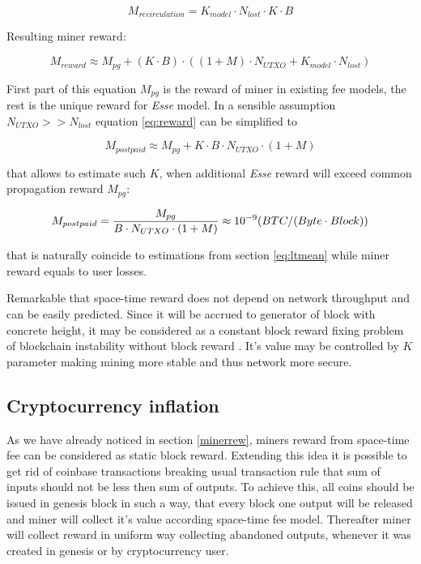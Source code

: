 \documentclass[]{article}   %
\newcommand{\authnote}[2]{\marginpar{\parbox{\marginparwidth}{\tiny %
  \textsf{#1 {\textcolor{blue}{notes: #2}}}}}%
  \textcolor{blue}{\textbf{\dag}}}
\newcommand{\authnote}[2]{
  \textsf{#1 \textcolor{blue}{: #2}}}
\newcommand{\authnote}[2]{}
\newcommand{\dnote}[1]{{\authnote{\textcolor{blue}{Dima notes}}{#1}}}
\newcommand{\esse}{\textit{Esse}}
\begin{document}
\begin{equation}
M_{recirculation} = {K_{model} \cdot  N_{lost} \cdot K \cdot B}
\end{equation}

Resulting miner reward:

\begin{equation}
\label{eq:reward}
M_{reward} \approx M_{pg} + (K \cdot B) \cdot ((1 + M) \cdot N_{UTXO} + K_{model} \cdot N_{lost})
\end{equation}

First part of this equation $M_{pg}$ is the reward of miner in existing fee models, the rest is the unique reward for \esse{} model.  In a sensible assumption $N_{UTXO} >> N_{lost}$ equation \ref{eq:reward} can be simplified to

\begin{equation}
M_{postpaid} \approx M_{pg} + K \cdot B \cdot N_{UTXO} \cdot (1 + M)
\end{equation}

that allows to estimate such $K$, when additional \esse{} reward will exceed common propagation reward $M_{pg}$:

\begin{equation}
M_{postpaid} = {M_{pg} \over B \cdot N_{UTXO} \cdot (1 + M)} \approx 10^{-9} ({BTC / (Byte \cdot Block)})
\end{equation}

that is naturally coincide to estimations from section \ref{eq:ltmean} while miner reward equals to user losses.

Remarkable that space-time reward does not depend on network throughput and can be easily predicted. Since it will be accrued to generator of block with concrete height, it may be considered as a constant block reward fixing problem of blockchain instability without block reward \cite{carlsten2016instability}. It's value may be controlled by $K$ parameter making mining more stable and thus network more secure.

\dnote{What is an output value when miner is interested in collecting it?}

\subsection{Cryptocurrency inflation}

As we have already noticed in section \ref{minerrew}, miners reward from space-time fee can be considered as static block reward. Extending this idea it is possible to get rid of coinbase transactions breaking usual transaction rule that sum of inputs should not be less then sum of outputs. To achieve this, all coins should be issued in genesis block in such a way, that every block one output will be released and miner will collect it's value according space-time fee model. Thereafter miner will collect reward in uniform way collecting abandoned outputs, whenever it was created in genesis or by cryptocurrency user.
\end{document}
